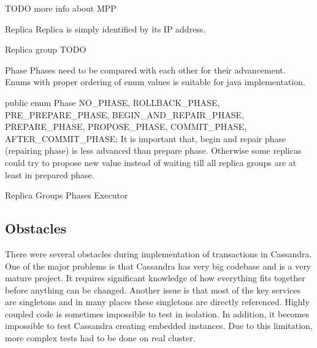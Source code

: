 TODO more info about MPP


Replica
Replica is simply identified by its IP address. 


Replica group
TODO


Phase
Phases need to be compared with each other for their advancement. Enums with proper ordering of enum values is suitable for java implementation.


public enum Phase
{
   NO_PHASE,
   ROLLBACK_PHASE,
   PRE_PREPARE_PHASE,
   BEGIN_AND_REPAIR_PHASE,
   PREPARE_PHASE,
   PROPOSE_PHASE,
   COMMIT_PHASE,
   AFTER_COMMIT_PHASE;
}
It is important that, begin and repair phase (repairing phase) is less advanced than prepare phase. Otherwise some replicas could try to propose new value instead of waiting till all replica groups are at least in prepared phase.


Replica Groups Phases Executor




\subsection{Obstacles}
There were several obstacles during implementation of transactions in Cassandra. One of the major problems is that Cassandra has very big codebase and is a very mature project. It requires significant knowledge of how everything fits together before anything can be changed. 
Another issue is that most of the key services are singletons and in many places these singletons are directly referenced. Highly coupled code is sometimes impossible to test in isolation. In addition, it becomes impossible to test Cassandra creating embedded instances. Due to this limitation, more complex tests had to be done on real cluster.

